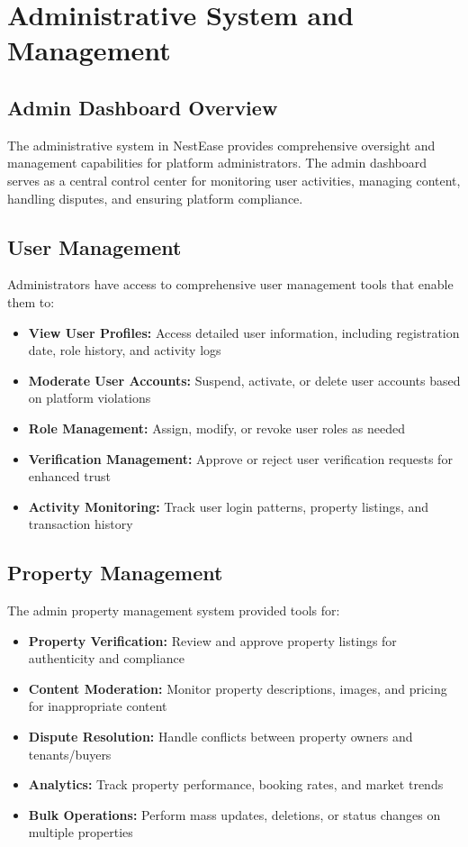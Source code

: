 \documentclass[conference]{IEEEtran}
\begin{document}
\section{Administrative System and Management}
\subsection{Admin Dashboard Overview}
The administrative system in NestEase provides comprehensive oversight and management capabilities for platform administrators. The admin dashboard serves as a central control center for monitoring user activities, managing content, handling disputes, and ensuring platform compliance.

\subsection{User Management}
Administrators have access to comprehensive user management tools that enable them to:

\begin{itemize}
    \item \textbf{View User Profiles:} Access detailed user information, including registration date, role history, and activity logs
    \item \textbf{Moderate User Accounts:} Suspend, activate, or delete user accounts based on platform violations
    \item \textbf{Role Management:} Assign, modify, or revoke user roles as needed
    \item \textbf{Verification Management:} Approve or reject user verification requests for enhanced trust
    \item \textbf{Activity Monitoring:} Track user login patterns, property listings, and transaction history
\end{itemize}


\subsection{Property Management}
The admin property management system provided tools for:

\begin{itemize}
    \item \textbf{Property Verification:} Review and approve property listings for authenticity and compliance
    \item \textbf{Content Moderation:} Monitor property descriptions, images, and pricing for inappropriate content
    \item \textbf{Dispute Resolution:} Handle conflicts between property owners and tenants/buyers
    \item \textbf{Analytics:} Track property performance, booking rates, and market trends
    \item \textbf{Bulk Operations:} Perform mass updates, deletions, or status changes on multiple properties
\end{itemize}
\end{document}
